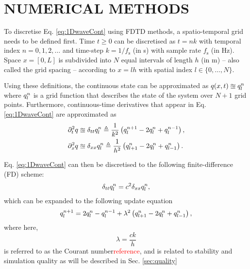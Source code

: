 \documentclass[fleqn]{jaes}
\def\SBcomment[#1]{\textcolor{red}{#1}}
\begin{document}
\section{NUMERICAL METHODS}\label{sec:numericalMethods}
To discretise Eq. \eqref{eq:1DwaveCont} using FDTD methods, a spatio-temporal grid needs to be defined first. 
Time $t\geq 0$ can be discretised as $t = nk$ with temporal index $n = 0, 1, 2, \hdots$ and time-step $k = 1/f_\text{s}$ (in s) with sample rate $f_\text{s}$ (in Hz). Space $x = [0, L]$ is subdivided into $N$ equal intervals of length $h$ (in m) -- also called the grid spacing -- according to $x = lh$ with spatial index $l\in \{0, \hdots, N\}$. 

Using these definitions, the continuous state can be approximated as $q(x,t) \approxeq q_l^n$ where $q_l^n$ is a grid function that describes the state of the system over $N+1$ grid points. Furthermore, continuous-time derivatives that appear in Eq. \eqref{eq:1DwaveCont} are approximated as
\begin{subequations}
\begin{align}
    \partial_t^2 q &\approxeq \delta_{tt} q_l^n \triangleq \frac{1}{k^2}\left(q_l^{n+1} - 2 q_l^n + q_l^{n-1}\right),\\
    \partial_x^2 q &\approxeq \delta_{xx} q_l^n \triangleq \frac{1}{h^2}\left(q_{l+1}^n - 2 q_l^n + q_{l-1}^n\right).
\end{align}
\end{subequations}

Eq. \eqref{eq:1DwaveCont} can then be discretised to the following finite-difference (FD) scheme:
\begin{equation}\label{eq:1dWaveDisc}
    \dtt \qln = c^2 \dxx \qln,
\end{equation}
which can be expanded to the following update equation
\begin{equation}\label{eq:1DwaveUpdate}
    q_l^{n+1} = 2 \qln - q_l^{n-1} + \lambda^2 \left(q_{l+1}^n -2\qln + q_{l-1}^n\right),
\end{equation}
where here, 
\begin{equation}\label{eq:courant}
    \lambda = \frac{c k}{h}
\end{equation} is referred to as the Courant number\SBcomment[reference], and is related to stability and simulation quality as will be described in Sec. \ref{sec:quality}
\end{document}
